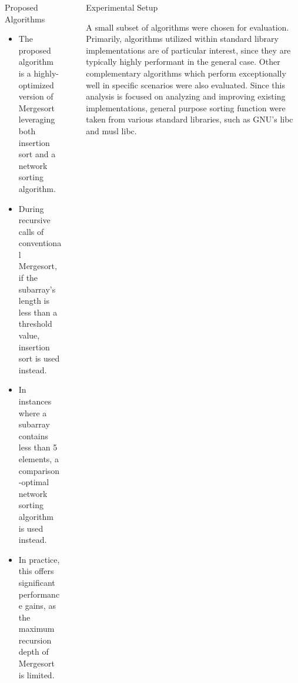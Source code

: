 \documentclass[final]{beamer}
\newlength{\sepwidth}
\newlength{\colwidth}
\newcommand{\separatorcolumn}{\begin{column}{\sepwidth}\end{column}}
\begin{document}
\begin{frame}[t]
\begin{columns}[t]
\begin{column}{\colwidth}
			\begin{block}{Proposed Algorithms}
				\begin{itemize}
					\item The proposed algorithm is a highly-optimized version of
					      Mergesort leveraging both insertion sort and a network
					      sorting algorithm.
					\item During recursive calls of conventional Mergesort, if the
					      subarray's length is less than a threshold value,
					      insertion sort is used instead.
					\item In instances where a subarray contains less than 5
					      elements, a comparison-optimal network sorting algorithm
					      is used instead.
					\item In practice, this offers significant performance gains,
					      as the maximum recursion depth of Mergesort is limited.
				\end{itemize}
			\end{block}
		\end{column}

		\separatorcolumn

		\begin{column}{\colwidth}

			\begin{block}{Experimental Setup}

				A small subset of algorithms were chosen for evaluation.
				Primarily, algorithms utilized within standard library
				implementations are of particular interest, since they are
				typically highly performant in the general case. Other
				complementary algorithms which perform exceptionally well in
				specific scenarios were also evaluated. Since this analysis is
				focused on analyzing and improving existing implementations,
				general purpose sorting function were taken from various standard
				libraries, such as GNU's libc\parencite{glibc} and musl
				libc\parencite{musl_libc}.


\end{block}
\end{column}
\end{columns}
\end{frame}
\end{document}
